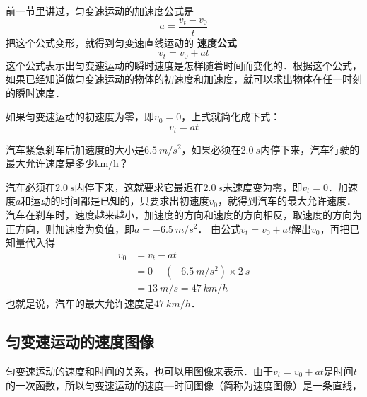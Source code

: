 前一节里讲过，匀变速运动的加速度公式是
\[a=\frac{v_t-v_0}{t} \]
把这个公式变形，就得到匀变速直线运动的\textbf{ 速度公式}
\begin{equation}
    v_t=v_0+at
\end{equation}
这个公式表示出匀变速运动的瞬时速度是怎样随着时间而变化的．根据这个公式，如果已经知道做匀变速运动的物体的初速度和加速度，就可以求出物体在任一时刻的瞬时速度．

如果匀变速运动的初速度为零，即$v_0=0$，上式就简化成下式：
\[v_t=at \]

\begin{Example}
    汽车紧急刹车后加速度的大小是$\qty{6.5}{m/s^2}$，如果必须在$\qty{2.0}{s}$内停下来，汽车行驶的最大允许速度是多少\si{km/h}？
\end{Example}

\begin{Answer}
    汽车必须在$\qty{2.0}{s}$内停下来，这就要求它最迟在$\qty{2.0}{s}$末速度变为零，即$v_t=0$．加速度$a$和运动的时间都是已知的，只要求出初速度$v_0$，就得到汽车的最大允许速度．
    汽车在刹车时，速度越来越小，加速度的方向和速度的方向相反，取速度的方向为正方向，则加速度为负值，即$a=\qty{-6.5}{m/s^2}$．
    由公式$v_t=v_0+at$解出$v_0$，再把已知量代入得
    \begin{equation*}
        \begin{aligned}
            v_0 & =v_t-at                                 \\
                & =0-(\qty{-6.5}{m/s^2})\times \qty{2}{s} \\
                & =\qty{13}{m/s}=\qty{47}{km/h}
        \end{aligned}
    \end{equation*}
    也就是说，汽车的最大允许速度是$\qty{47}{km/h}$．
\end{Answer}


\subsection{匀变速运动的速度图像}

匀变速运动的速度和时间的关系，也可以用图像来表示．由于$v_t=v_0+at$是时间$t$的一次函数，所以匀变速运动的速度---时间图像（简称为速度图像）是一条直线，

